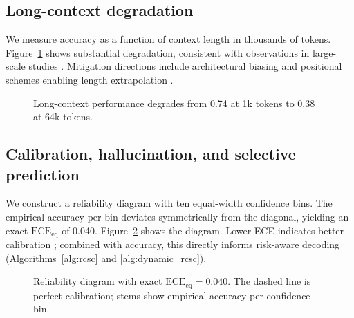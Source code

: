 \documentclass[10pt]{article}
\begin{document}
\subsection{Long-context degradation}
We measure accuracy as a function of context length in thousands of tokens. Figure~\ref{fig:context} shows substantial degradation, consistent with observations in large-scale studies \citep{Rae2021Gopher, Liang2022HELM, Liu2023LostInTheMiddle}. Mitigation directions include architectural biasing and positional schemes enabling length extrapolation \citep{Press2021ALiBi, Su2021RoFormer}.

\begin{figure}[ht]
\centering
{}
\vspace{0.5em}
\caption{Long-context performance degrades from 0.74 at 1k tokens to 0.38 at 64k tokens.}
\label{fig:context}
\end{figure}

\subsection{Calibration, hallucination, and selective prediction}
We construct a reliability diagram with ten equal-width confidence bins. The empirical accuracy per bin deviates symmetrically from the diagonal, yielding an exact $\mathrm{ECE}_{\mathrm{eq}}$ of 0.040. Figure~\ref{fig:calibration} shows the diagram. Lower ECE indicates better calibration \citep{Guo2017Calibration, Desai2020Calibration}; combined with accuracy, this directly informs risk-aware decoding (Algorithms~\ref{alg:rcsc} and \ref{alg:dynamic_rcsc}).

\begin{figure}[ht]
\centering
{}
\vspace{0.5em}
\caption{Reliability diagram with exact $\mathrm{ECE}_{\mathrm{eq}} = 0.040$. The dashed line is perfect calibration; stems show empirical accuracy per confidence bin.}
\label{fig:calibration}
\end{figure}
\end{document}
